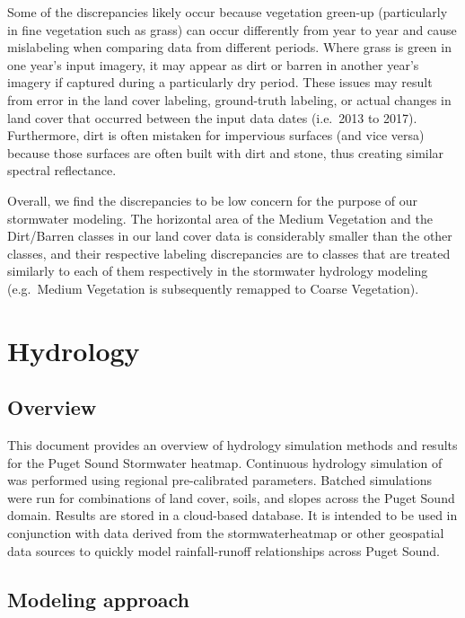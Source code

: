 \documentclass[
]{report}
\begin{document}
Some of the discrepancies likely occur because vegetation green-up (particularly in fine vegetation such as grass) can occur differently from year to year and cause mislabeling when comparing data from different periods. Where grass is green in one year's input imagery, it may appear as dirt or barren in another year's imagery if captured during a particularly dry period. These issues may result from error in the land cover labeling, ground-truth labeling, or actual changes in land cover that occurred between the input data dates (i.e.~2013 to 2017). Furthermore, dirt is often mistaken for impervious surfaces (and vice versa) because those surfaces are often built with dirt and stone, thus creating similar spectral reflectance.

Overall, we find the discrepancies to be low concern for the purpose of our stormwater modeling. The horizontal area of the Medium Vegetation and the Dirt/Barren classes in our land cover data is considerably smaller than the other classes, and their respective labeling discrepancies are to classes that are treated similarly to each of them respectively in the stormwater hydrology modeling (e.g.~Medium Vegetation is subsequently remapped to Coarse Vegetation).

\hypertarget{hydrology}{%
\chapter{Hydrology}\label{hydrology}}

\hypertarget{overview-1}{%
\section{Overview}\label{overview-1}}

This document provides an overview of hydrology simulation methods and results for the Puget Sound Stormwater heatmap. Continuous hydrology simulation of was performed using regional pre-calibrated parameters. Batched simulations were run for combinations of land cover, soils, and slopes across the Puget Sound domain. Results are stored in a cloud-based database. It is intended to be used in conjunction with data derived from the stormwaterheatmap or other geospatial data sources to quickly model rainfall-runoff relationships across Puget Sound.

\hypertarget{modeling-approach}{%
\section{Modeling approach}\label{modeling-approach}}
\end{document}
